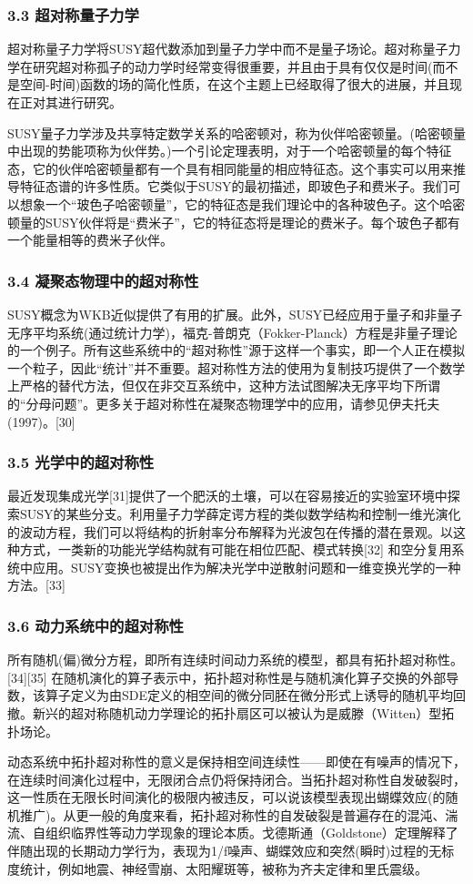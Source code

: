 \subsubsection{3.3 超对称量子力学}
超对称量子力学将SUSY超代数添加到量子力学中而不是量子场论。超对称量子力学在研究超对称孤子的动力学时经常变得很重要，并且由于具有仅仅是时间(而不是空间-时间)函数的场的简化性质，在这个主题上已经取得了很大的进展，并且现在正对其进行研究。

SUSY量子力学涉及共享特定数学关系的哈密顿对，称为伙伴哈密顿量。(哈密顿量中出现的势能项称为伙伴势。)一个引论定理表明，对于一个哈密顿量的每个特征态，它的伙伴哈密顿量都有一个具有相同能量的相应特征态。这个事实可以用来推导特征态谱的许多性质。它类似于SUSY的最初描述，即玻色子和费米子。我们可以想象一个“玻色子哈密顿量”，它的特征态是我们理论中的各种玻色子。这个哈密顿量的SUSY伙伴将是“费米子”，它的特征态将是理论的费米子。每个玻色子都有一个能量相等的费米子伙伴。
\subsubsection{3.4 凝聚态物理中的超对称性}
SUSY概念为WKB近似提供了有用的扩展。此外，SUSY已经应用于量子和非量子无序平均系统(通过统计力学)，福克-普朗克（Fokker-Planck）方程是非量子理论的一个例子。所有这些系统中的“超对称性”源于这样一个事实，即一个人正在模拟一个粒子，因此“统计”并不重要。超对称性方法的使用为复制技巧提供了一个数学上严格的替代方法，但仅在非交互系统中，这种方法试图解决无序平均下所谓的“分母问题”。更多关于超对称性在凝聚态物理学中的应用，请参见伊夫托夫(1997)。[30]
\subsubsection{3.5 光学中的超对称性}
最近发现集成光学[31]提供了一个肥沃的土壤，可以在容易接近的实验室环境中探索SUSY的某些分支。利用量子力学薛定谔方程的类似数学结构和控制一维光演化的波动方程，我们可以将结构的折射率分布解释为光波包在传播的潜在景观。以这种方式，一类新的功能光学结构就有可能在相位匹配、模式转换[32] 和空分复用系统中应用。SUSY变换也被提出作为解决光学中逆散射问题和一维变换光学的一种方法。[33]
\subsubsection{3.6 动力系统中的超对称性}
所有随机(偏)微分方程，即所有连续时间动力系统的模型，都具有拓扑超对称性。[34][35] 在随机演化的算子表示中，拓扑超对称性是与随机演化算子交换的外部导数，该算子定义为由SDE定义的相空间的微分同胚在微分形式上诱导的随机平均回撤。新兴的超对称随机动力学理论的拓扑扇区可以被认为是威滕（Witten）型拓扑场论。

动态系统中拓扑超对称性的意义是保持相空间连续性——即使在有噪声的情况下，在连续时间演化过程中，无限闭合点仍将保持闭合。当拓扑超对称性自发破裂时，这一性质在无限长时间演化的极限内被违反，可以说该模型表现出蝴蝶效应(的随机推广)。从更一般的角度来看，拓扑超对称性的自发破裂是普遍存在的混沌、湍流、自组织临界性等动力学现象的理论本质。戈德斯通（Goldstone）定理解释了伴随出现的长期动力学行为，表现为1/f噪声、蝴蝶效应和突然(瞬时)过程的无标度统计，例如地震、神经雪崩、太阳耀斑等，被称为齐夫定律和里氏震级。